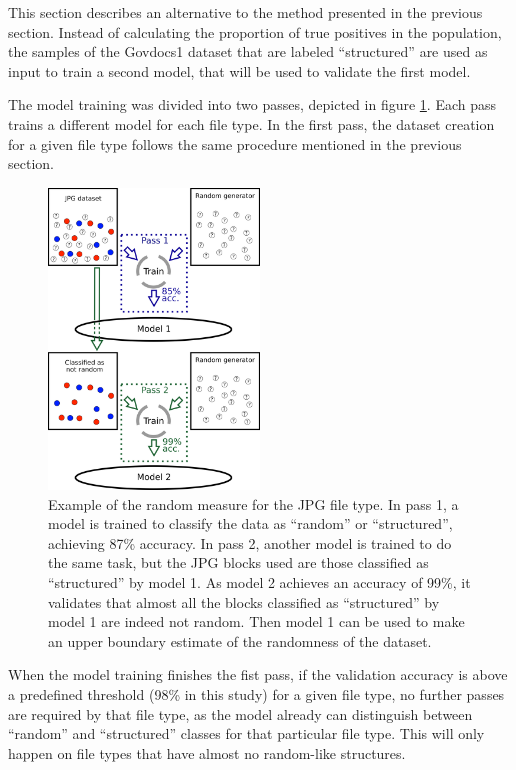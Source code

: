This section describes an alternative to the method presented in the previous section. Instead of calculating the proportion of true positives in the population, the samples of the Govdocs1 dataset that are labeled ``structured'' are used as input to train a second model, that will be used to validate the first model.

The model training was divided into two passes, depicted in figure \ref{fig:randommeasure}. Each pass trains a different model for each file type. In the first pass, the dataset creation for a given file type follows the same procedure mentioned in the previous section.

\noindent
\begin{figure}[htb!]
\centering\includegraphics[width=0.5\textwidth]{content/random_measure.png}
\caption{\label{fig:randommeasure}Example of the random measure for the JPG file type. In pass 1, a model is trained to classify the data as ``random'' or ``structured'', achieving 87\% accuracy. In pass 2, another model is trained to do the same task, but the JPG blocks used are those classified as ``structured'' by model 1. As model 2 achieves an accuracy of 99\%, it validates that almost all the blocks classified as ``structured'' by model 1 are indeed not random. Then model 1 can be used to make an upper boundary estimate of the randomness of the dataset.}%
\end{figure}

When the model training finishes the fist pass, if the validation accuracy is above a predefined threshold (98\% in this study) for a given file type, no further passes are required by that file type, as the model already can distinguish between ``random'' and ``structured'' classes for that particular file type. This will only happen on file types that have almost no random-like structures.

